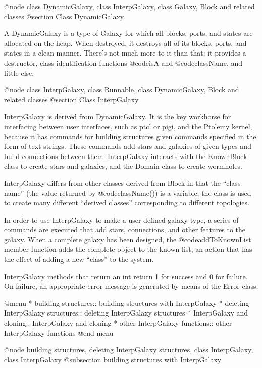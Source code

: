 @node class DynamicGalaxy, class InterpGalaxy, class Galaxy, Block and related classes
@section Class DynamicGalaxy

A DynamicGalaxy is a type of Galaxy for which all blocks, ports, and
states are allocated on the heap.  When destroyed, it destroys all of
its blocks, ports, and states in a clean manner.  There's not much
more to it than that: it provides a destructor, class identification
functions @code{isA} and @code{className}, and little else.

@node class InterpGalaxy, class Runnable, class DynamicGalaxy, Block and related classes
@section Class InterpGalaxy

InterpGalaxy is derived from DynamicGalaxy.  It is the key workhorse
for interfacing between user interfaces, such as ptcl or pigi, and
the Ptolemy kernel, because it has commands for building structures
given commands specified in the form of text strings.  These commands
add stars and galaxies of given types and build connections between
them.  InterpGalaxy interacts with the KnownBlock class to create
stars and galaxies, and the Domain class to create wormholes.

InterpGalaxy differs from other classes derived from Block in that
the ``class name'' (the value returned by @code{className()}) is a
variable; the class is used to create many different ``derived classes''
corresponding to different topologies.

In order to use InterpGalaxy to make a user-defined galaxy type,
a series of commands are executed that add stars, connections, and
other features to the galaxy.  When a complete galaxy has been
designed, the @code{addToKnownList} member function adds the complete
object to the known list, an action that has the effect of adding a
new ``class'' to the system.

InterpGalaxy methods that return an int return 1 for success and 0
for failure.  On failure, an appropriate error message is generated
by means of the Error class.


@menu
* building structures::         building structures with InterpGalaxy
* deleting InterpGalaxy structures::  deleting InterpGalaxy structures
* InterpGalaxy and cloning::    InterpGalaxy and cloning
* other InterpGalaxy functions::  other InterpGalaxy functions
@end menu

@node building structures, deleting InterpGalaxy structures, class InterpGalaxy, class InterpGalaxy
@subsection building structures with InterpGalaxy

